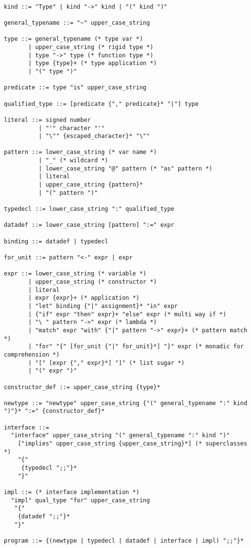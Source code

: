 \documentclass[11pt]{article}
\begin{document}
\begin{verbatim}

kind ::= "Type" | kind "->" kind | "(" kind ")"

general_typename ::= "~" upper_case_string

type ::= general_typename (* type var *)
       | upper_case_string (* rigid type *)
       | type "->" type (* function type *)
       | type {type}+ (* type application *)
       | "(" type ")"

predicate ::= type "is" upper_case_string

qualified_type ::= [predicate {"," predicate}* "|"] type

literal ::= signed number
          | "'" character "'"
          | "\"" {escaped_character}* "\""

pattern ::= lower_case_string (* var name *)
          | "_" (* wildcard *)
          | lower_case_string "@" pattern (* "as" pattern *)
          | literal
          | upper_case_string {pattern}*
          | "(" pattern ")"

typedecl ::= lower_case_string ":" qualified_type

datadef ::= lower_case_string [pattern] ":=" expr

binding ::= datadef | typedecl

for_unit ::= pattern "<-" expr | expr

expr ::= lower_case_string (* variable *)
       | upper_case_string (* constructor *)
       | literal
       | expr {expr}+ (* application *)
       | "let" binding {"|" assignment}* "in" expr
       | {"if" expr "then" expr}+ "else" expr (* multi way if *)
       | "\ " pattern "->" expr (* lambda *)
       | "match" expr "with" {"|" pattern "->" expr}+ (* pattern match *)
       | "for" "{" [for_unit {"|" for_unit}*] "}" expr (* monadic for comprehension *)
       | "[" [expr {"," expr}*] "]" (* list sugar *)
       | "(" expr ")"

constructor_def ::= upper_case_string {type}*

newtype ::= "newtype" upper_case_string {"(" general_typename ":" kind ")"}* ":=" {constructor_def}*

interface ::= 
  "interface" upper_case_string "(" general_typename ":" kind ")"
    ["implies" upper_case_string {upper_case_string}*] (* superclasses *)
    "{"
     {typedecl ";;"}*
    "}"

impl ::= (* interface implementation *)
  "impl" qual_type "for" upper_case_string
   "{"
    {datadef ";;"}*
   "}"

program ::= {(newtype | typedecl | datadef | interface | impl) ";;"}*

\end{verbatim}
\end{document}
